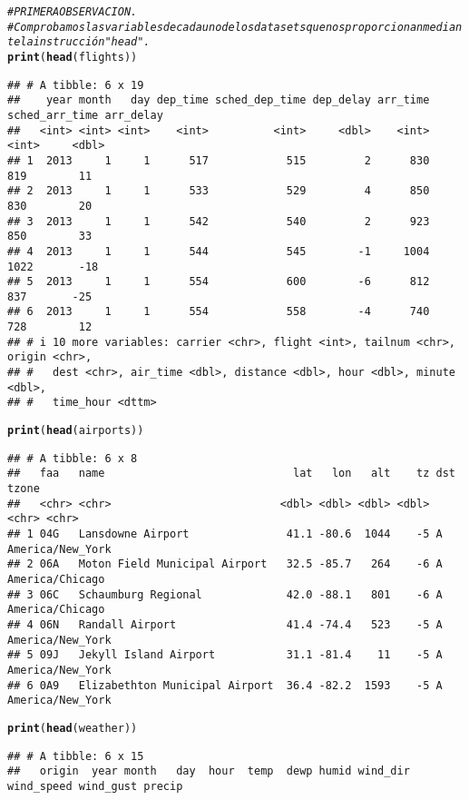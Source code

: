 \documentclass{article}\usepackage[]{graphicx}\usepackage[]{xcolor}
\makeatletter
\newcommand{\hlcom}[1]{\textcolor[rgb]{0.678,0.584,0.686}{\textit{#1}}}%
\newcommand{\hlstd}[1]{\textcolor[rgb]{0.345,0.345,0.345}{#1}}%
\newcommand{\hlkwd}[1]{\textcolor[rgb]{0.737,0.353,0.396}{\textbf{#1}}}%
\newenvironment{kframe}{%
 \def\at@end@of@kframe{}%
 \ifinner\ifhmode%
  \def\at@end@of@kframe{\end{minipage}}%
  \begin{minipage}{\columnwidth}%
 \fi\fi%
 \def\FrameCommand##1{\hskip\@totalleftmargin \hskip-\fboxsep
 \colorbox{shadecolor}{##1}\hskip-\fboxsep
     \hskip-\linewidth \hskip-\@totalleftmargin \hskip\columnwidth}%
 \MakeFramed {\advance\hsize-\width
   \@totalleftmargin\z@ \linewidth\hsize
   \@setminipage}}%
 {\par\unskip\endMakeFramed%
 \at@end@of@kframe}
\newenvironment{knitrout}{}{} %
\makeatother
\begin{document}
\begin{knitrout}
\begin{kframe}
\begin{alltt}
\hlcom{# PRIMERA OBSERVACION.}
\hlcom{# Comprobamos las variables de cada uno de los datasets que nos proporcionan mediante la instrucción "head".}
\hlkwd{print}\hlstd{(}\hlkwd{head}\hlstd{(flights))}
\end{alltt}
\begin{verbatim}
## # A tibble: 6 x 19
##    year month   day dep_time sched_dep_time dep_delay arr_time sched_arr_time arr_delay
##   <int> <int> <int>    <int>          <int>     <dbl>    <int>          <int>     <dbl>
## 1  2013     1     1      517            515         2      830            819        11
## 2  2013     1     1      533            529         4      850            830        20
## 3  2013     1     1      542            540         2      923            850        33
## 4  2013     1     1      544            545        -1     1004           1022       -18
## 5  2013     1     1      554            600        -6      812            837       -25
## 6  2013     1     1      554            558        -4      740            728        12
## # i 10 more variables: carrier <chr>, flight <int>, tailnum <chr>, origin <chr>,
## #   dest <chr>, air_time <dbl>, distance <dbl>, hour <dbl>, minute <dbl>,
## #   time_hour <dttm>
\end{verbatim}
\begin{alltt}
\hlkwd{print}\hlstd{(}\hlkwd{head}\hlstd{(airports))}
\end{alltt}
\begin{verbatim}
## # A tibble: 6 x 8
##   faa   name                             lat   lon   alt    tz dst   tzone           
##   <chr> <chr>                          <dbl> <dbl> <dbl> <dbl> <chr> <chr>           
## 1 04G   Lansdowne Airport               41.1 -80.6  1044    -5 A     America/New_York
## 2 06A   Moton Field Municipal Airport   32.5 -85.7   264    -6 A     America/Chicago 
## 3 06C   Schaumburg Regional             42.0 -88.1   801    -6 A     America/Chicago 
## 4 06N   Randall Airport                 41.4 -74.4   523    -5 A     America/New_York
## 5 09J   Jekyll Island Airport           31.1 -81.4    11    -5 A     America/New_York
## 6 0A9   Elizabethton Municipal Airport  36.4 -82.2  1593    -5 A     America/New_York
\end{verbatim}
\begin{alltt}
\hlkwd{print}\hlstd{(}\hlkwd{head}\hlstd{(weather))}
\end{alltt}
\begin{verbatim}
## # A tibble: 6 x 15
##   origin  year month   day  hour  temp  dewp humid wind_dir wind_speed wind_gust precip

\end{verbatim}
\end{kframe}
\end{knitrout}
\end{document}
